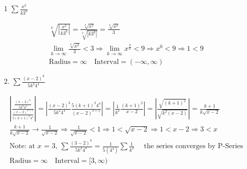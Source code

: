 \documentclass[\pointsize, letterpaper]{article}
\begin{document}
    \begin{itemize}
        \item [1] $\sum\frac{x^{2}}{k3^{k}}$
        \\
        \begin{mdframed}
            \begin{equation*}
                \begin{gathered}
                    \sqrt[k]{\left|\frac{x^{2}}{k3^{k}}\right|}
                    = \frac{\sqrt[k]{x^{2}}}{\sqrt[k]{|k3^{k}|}}
                    = \frac{\sqrt[k]{x^{2}}}{3}                     \\
                    \lim_{k\to\infty}\frac{\sqrt[k]{x^{2}}}{3} < 3  \Rightarrow
                    \lim_{k\to\infty}x^{\frac{2}{k}} < 9            \Rightarrow
                    x^{0} < 9 \Rightarrow 1 < 9                     \\
                    \text{Radius} = \infty \quad \text{Interval} = (-\infty,\infty)
                \end{gathered}
            \end{equation*}
        \end{mdframed}

        \item[2.] $\sum\frac{(x-2)^{k}}{5k^{2}4^{4}}$
        \\
        \begin{mdframed}
            \begin{equation*}
                \begin{gathered}
                    \left|\frac {\frac{(x-2)^{k}}{5k^{2}4^{4}}}
                                {\frac{(x-2)^{k+1}}{5(k+1)^{2}4^{4}}}\right|
                    = \left|\frac{(x-2)^{k}}{5k^{2}4^{4}}\frac{5(k+1)^{2}4^{4}}{(x-2)^{k+1}}\right|
                    = \left|\frac{1}{k^{2}}\frac{(k+1)^{2}}{x-2}\right|
                    = \left|\frac{\sqrt{(k+1)^{2}}}{\sqrt{k^{2}(x-2)}}\right|
                    = \frac{k+1}{k\sqrt{x-2}}   \\
                    \frac{k+1}{k\sqrt{x-2}}     \to 
                    \frac{1}{\sqrt{x-2}}        \Rightarrow
                    \frac{1}{\sqrt{x-2}} < 1    \Rightarrow
                    1 < \sqrt{x-2}              \Rightarrow
                    1 < x-2                     \Rightarrow
                    3 < x                       \\
                    \text{Note: at $x$ = 3, } 
                    \sum\frac{(3-2)^{k}}{5k^{2}4^{4}} =
                    \frac{1}{5(4^{4})}\sum\frac{1}{k^{2}}
                    \quad \text{ the series converges by P-Series}
                    \\
                    \text{Radius} = \infty \quad \text{Interval} = [3,\infty)
                \end{gathered}
            \end{equation*}
        \end{mdframed}
    \end{itemize}
\end{document}
